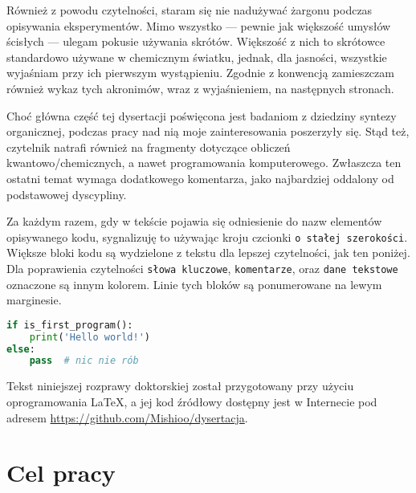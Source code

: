 Również z powodu czytelności, staram się nie nadużywać żargonu podczas opisywania eksperymentów.
Mimo wszystko --- pewnie jak większość umysłów ścisłych --- ulegam pokusie używania skrótów.
Większość z nich to skrótowce standardowo używane w chemicznym światku,
jednak, dla jasności, wszystkie wyjaśniam przy ich pierwszym wystąpieniu.
Zgodnie z konwencją zamieszczam również wykaz tych akronimów, wraz z wyjaśnieniem, na następnych stronach.

Choć główna część tej dysertacji poświęcona jest badaniom z dziedziny syntezy organicznej,
podczas pracy nad nią moje zainteresowania poszerzyły się.
Stąd też, czytelnik natrafi również na fragmenty dotyczące obliczeń kwantowo\-/chemicznych, a nawet programowania komputerowego.
Zwłaszcza ten ostatni temat wymaga dodatkowego komentarza, jako najbardziej oddalony od podstawowej dyscypliny.

Za każdym razem, gdy w tekście pojawia się odniesienie do nazw elementów opisywanego kodu,
sygnalizuję to używając kroju czcionki \verb!o stałej szerokości!.
Większe bloki kodu są wydzielone z tekstu dla lepszej czytelności, jak ten poniżej.
Dla poprawienia czytelności 
\lstinline[basicstyle=\ttfamily\color{wongvermillion},columns=fixed]!słowa kluczowe!, 
\lstinline[basicstyle=\ttfamily\color{wongsky},columns=fixed]!komentarze!, oraz 
\lstinline[basicstyle=\ttfamily\color{wonggreen},columns=fixed]!dane tekstowe!
oznaczone są innym kolorem.
Linie tych bloków są ponumerowane na lewym marginesie.

\begin{lstlisting}[language=Python]
if is_first_program():
    print('Hello world!')
else:
    pass  # nic nie rób
\end{lstlisting}

Tekst niniejszej rozprawy doktorskiej został przygotowany przy użyciu oprogramowania \LaTeX,
a jej kod źródłowy dostępny jest w Internecie pod adresem \url{https://github.com/Mishioo/dysertacja}.

\begin{fullwidth}
\printglossary[title=Wykaz skrótów, type=\acronymtype]
\end{fullwidth}

\section{Cel pracy}
